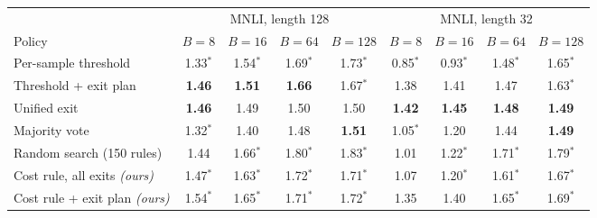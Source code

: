 \begin{tabular}{@{}lcccccccc@{}}
\toprule
 & \multicolumn{4}{c}{MNLI, length 128} & \multicolumn{4}{c}{MNLI, length 32} \\
\cmidrule(lr){2-5}\cmidrule(lr){6-9}
Policy & $B=8$ & $B=16$ & $B=64$ & $B=128$ & $B=8$ & $B=16$ & $B=64$ & $B=128$ \\
\midrule
Per-sample threshold & 1.33$^{*}$ & 1.54$^{*}$ & 1.69$^{*}$ & 1.73$^{*}$ & 0.85$^{*}$ & 0.93$^{*}$ & 1.48$^{*}$ & 1.65$^{*}$ \\
Threshold + exit plan & \textbf{1.46} & \textbf{1.51} & \textbf{1.66} & 1.67$^{*}$ & 1.38 & 1.41 & 1.47 & 1.63$^{*}$ \\
Unified exit & \textbf{1.46} & 1.49 & 1.50 & 1.50 & \textbf{1.42} & \textbf{1.45} & \textbf{1.48} & \textbf{1.49} \\
Majority vote & 1.32$^{*}$ & 1.40 & 1.48 & \textbf{1.51} & 1.05$^{*}$ & 1.20 & 1.44 & \textbf{1.49} \\
Random search (150 rules) & 1.44 & 1.66$^{*}$ & 1.80$^{*}$ & 1.83$^{*}$ & 1.01 & 1.22$^{*}$ & 1.71$^{*}$ & 1.79$^{*}$ \\
\midrule
Cost rule, all exits \textit{(ours)} & 1.47$^{*}$ & 1.63$^{*}$ & 1.72$^{*}$ & 1.71$^{*}$ & 1.07 & 1.20$^{*}$ & 1.61$^{*}$ & 1.67$^{*}$ \\
Cost rule + exit plan \textit{(ours)} & 1.54$^{*}$ & 1.65$^{*}$ & 1.71$^{*}$ & 1.72$^{*}$ & 1.35 & 1.40 & 1.65$^{*}$ & 1.69$^{*}$ \\
\bottomrule
\end{tabular}
